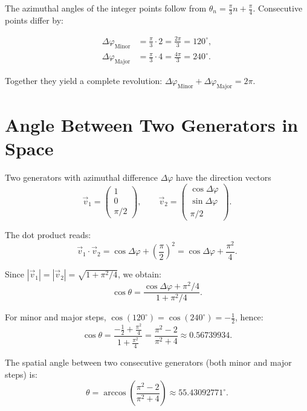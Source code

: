 The azimuthal angles of the integer points follow from
$\theta_n = \tfrac{\pi}{3}n + \tfrac{\pi}{4}$. Consecutive
points differ by:

\begin{align*}
  \Delta\varphi_{\text{Minor}} &= \frac{\pi}{3}\cdot 2 = \frac{2\pi}{3}
    = 120^\circ, \\
  \Delta\varphi_{\text{Major}} &= \frac{\pi}{3}\cdot 4 = \frac{4\pi}{3}
    = 240^\circ.
\end{align*}

Together they yield a complete revolution:
$\Delta\varphi_{\text{Minor}} + \Delta\varphi_{\text{Major}} = 2\pi$.

\section{Angle Between Two Generators in Space}

Two generators with azimuthal difference $\Delta\varphi$ have the
direction vectors
\[
  \vec{v}_1 = \begin{pmatrix}1\\0\\\pi/2\end{pmatrix},
  \qquad
  \vec{v}_2 = \begin{pmatrix}\cos\Delta\varphi\\\sin\Delta\varphi\\\pi/2\end{pmatrix}.
\]

The dot product reads:
\[
  \vec{v}_1 \cdot \vec{v}_2
  = \cos\Delta\varphi + \left(\frac{\pi}{2}\right)^2
  = \cos\Delta\varphi + \frac{\pi^2}{4}.
\]

Since $|\vec{v}_1| = |\vec{v}_2| = \sqrt{1+\pi^2/4}$, we obtain:
\[
  \cos\theta
  = \frac{\cos\Delta\varphi + \pi^2/4}{1 + \pi^2/4}.
\]

For minor and major steps, $\cos(120^\circ) = \cos(240^\circ) = -\tfrac{1}{2}$,
hence:
\[
  \cos\theta
  = \frac{-\tfrac{1}{2} + \tfrac{\pi^2}{4}}{1 + \tfrac{\pi^2}{4}}
  = \frac{\pi^2 - 2}{\pi^2 + 4}
  \approx 0.56739934.
\]

\begin{satz}
The spatial angle between two consecutive generators
(both minor and major steps) is:
\begin{equation}
  \theta = \arccos\!\left(\frac{\pi^2 - 2}{\pi^2 + 4}\right)
  \approx 55.43092771^\circ.
\end{equation}
\end{satz}

